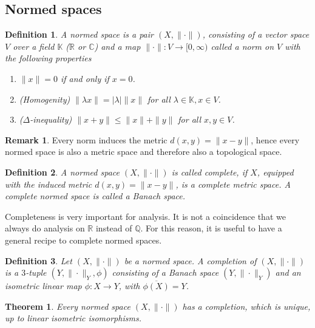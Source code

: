 \documentclass[11pt,a4paper]{article}
\newtheorem{thm}{Theorem}[section]
\newtheorem{defn}{Definition}[section]
\theoremstyle{definition}
\newtheorem{rem}{Remark}[section]
\begin{document}
\subsection{Normed spaces}
\begin{defn} A normed space is a pair $(X, \| \cdot \|)$, consisting of a vector space $V$ over a field $\mathbb{K}$ ($\mathbb{R}$ or $\mathbb{C}$) and a map $\| \cdot  \|: V \to [0, \infty)$ called a norm on $V$ with the following properties
\begin{enumerate}
\item $\|x\|=0$ if and only if $x=0$.
\item (Homogenity) $\| \lambda x \| = | \lambda | \|x \|$ for all $\lambda \in \mathbb{K}, x \in V$.
\item ($\Delta$-inequality) $\|x + y\| \leq \|x\|  + \|y\|$ for all $x,y \in V$. 
\end{enumerate}
\end{defn}
\begin{rem} Every norm induces the metric $d(x,y)= \|x-y\|$, hence every normed space is also a metric space and therefore also a topological space. 
\end{rem}
\begin{defn} A normed space $(X, \| \cdot \|)$ is called complete, if $X$, equipped with the induced metric $d(x,y)= \|x-y\|$, is a complete metric space. A complete normed space is called a Banach space. 
\end{defn}
\noindent Completeness is very important for analysis. It is not a coincidence that we always do analysis on $\mathbb{R}$ instead of $\mathbb{Q}$. For this reason, it is useful to have a general recipe to complete normed spaces. 
\begin{defn} Let $(X, \| \cdot \|)$ be a normed space. A completion of $(X, \| \cdot \|)$ is a $3$-tuple $(Y, \| \cdot \|_Y , \phi)$ consisting of a Banach space $(Y, \| \cdot \|_Y)$ and an isometric linear map $\phi :X \to Y$, with $\overline{\phi(X)}=Y$.
\end{defn}
\begin{thm} Every normed space $(X, \| \cdot \|)$ has a completion, which is unique, up to linear isometric isomorphisms. 
\end{thm}
\end{document}
